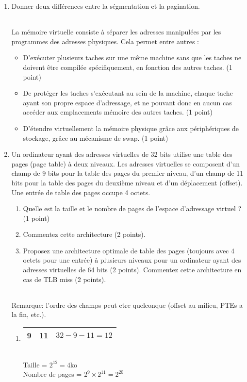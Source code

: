 \begin{enumerate}

\item Donner deux différences entre la ségmentation et la pagination.

\begin{correction}\\
La mémoire virtuelle consiste à séparer les adresses manipulées par les programmes des adresses physiques. Cela permet entre autres :
\begin{itemize}
  \item D'exécuter plusieurs taches  sur une même machine sans que les taches ne doivent être compilée spécifiquement, en fonction des autres taches. (1 point)
  \item De protéger les taches s'exécutant au sein de la machine, chaque tache ayant son propre espace d'adressage, et ne pouvant donc en aucun cas accéder aux emplacements mémoire des autres taches. (1 point)
  \item D'étendre virtuellement la mémoire physique grâce aux périphériques de stockage, grâce au mécanisme de swap. (1 point)
\end{itemize}
\end{correction}


\item Un ordinateur ayant des adresses virtuelles de 32 bits utilise une table des pages (page table) à deux niveaux. Les adresses virtuelles se composent d'un champ de 9 bits pour la table des pages du premier niveau, d'un champ de 11 bits pour la table des pages du deuxième niveau et d'un déplacement (offset). Une entrée de table des pages occupe 4 octets.
  \begin{enumerate}
  \item Quelle est la taille et le nombre de pages de l'espace d'adressage virtuel ? (1 point)
  \item Commentez cette architecture (2 points).
  \item Proposez une architecture optimale de table des pages (toujours avec 4 octets pour une entrée) à plusieurs niveaux pour un ordinateur ayant des adresses virtuelles de 64 bits (2 points). Commentez cette architecture en cas de TLB miss (2 points).
  \end{enumerate}

\begin{correction}\\
Remarque: l’ordre des champs peut etre quelconque (offset au milieu, PTEs a la fin, etc.).
\begin{enumerate}[label=(\alph*)]
  \item \begin{tabular}{|c|c|c|} \hline 9 & 11 & $32-9-11=12$\tabularnewline \hline \end{tabular} \\
        Taille = $2^{12}=4$ko \\
        Nombre de pages = $2^{9}\times2^{11}=2^{20}$


\end{enumerate}
\end{correction}
\end{enumerate}
